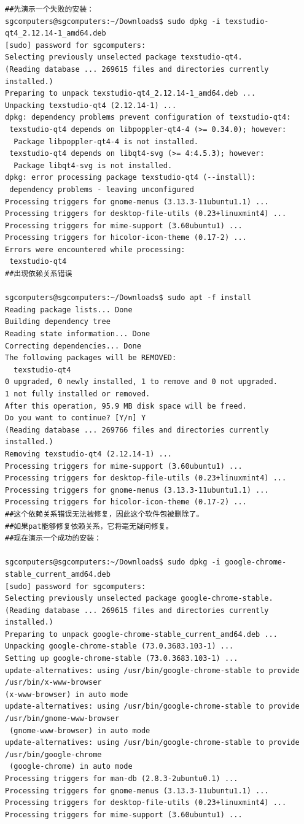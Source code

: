 \begin{verbatim}
##先演示一个失败的安装：
sgcomputers@sgcomputers:~/Downloads$ sudo dpkg -i texstudio-qt4_2.12.14-1_amd64.deb
[sudo] password for sgcomputers: 
Selecting previously unselected package texstudio-qt4.
(Reading database ... 269615 files and directories currently installed.)
Preparing to unpack texstudio-qt4_2.12.14-1_amd64.deb ...
Unpacking texstudio-qt4 (2.12.14-1) ...
dpkg: dependency problems prevent configuration of texstudio-qt4:
 texstudio-qt4 depends on libpoppler-qt4-4 (>= 0.34.0); however:
  Package libpoppler-qt4-4 is not installed.
 texstudio-qt4 depends on libqt4-svg (>= 4:4.5.3); however:
  Package libqt4-svg is not installed.
dpkg: error processing package texstudio-qt4 (--install):
 dependency problems - leaving unconfigured
Processing triggers for gnome-menus (3.13.3-11ubuntu1.1) ...
Processing triggers for desktop-file-utils (0.23+linuxmint4) ...
Processing triggers for mime-support (3.60ubuntu1) ...
Processing triggers for hicolor-icon-theme (0.17-2) ...
Errors were encountered while processing:
 texstudio-qt4
##出现依赖关系错误

sgcomputers@sgcomputers:~/Downloads$ sudo apt -f install
Reading package lists... Done
Building dependency tree       
Reading state information... Done
Correcting dependencies... Done
The following packages will be REMOVED:
  texstudio-qt4
0 upgraded, 0 newly installed, 1 to remove and 0 not upgraded.
1 not fully installed or removed.
After this operation, 95.9 MB disk space will be freed.
Do you want to continue? [Y/n] Y
(Reading database ... 269766 files and directories currently installed.)
Removing texstudio-qt4 (2.12.14-1) ...
Processing triggers for mime-support (3.60ubuntu1) ...
Processing triggers for desktop-file-utils (0.23+linuxmint4) ...
Processing triggers for gnome-menus (3.13.3-11ubuntu1.1) ...
Processing triggers for hicolor-icon-theme (0.17-2) ...
##这个依赖关系错误无法被修复，因此这个软件包被删除了。
##如果pat能够修复依赖关系，它将毫无疑问修复。
##现在演示一个成功的安装：

sgcomputers@sgcomputers:~/Downloads$ sudo dpkg -i google-chrome-stable_current_amd64.deb
[sudo] password for sgcomputers: 
Selecting previously unselected package google-chrome-stable.
(Reading database ... 269615 files and directories currently installed.)
Preparing to unpack google-chrome-stable_current_amd64.deb ...
Unpacking google-chrome-stable (73.0.3683.103-1) ...
Setting up google-chrome-stable (73.0.3683.103-1) ...
update-alternatives: using /usr/bin/google-chrome-stable to provide /usr/bin/x-www-browser 
(x-www-browser) in auto mode
update-alternatives: using /usr/bin/google-chrome-stable to provide /usr/bin/gnome-www-browser
 (gnome-www-browser) in auto mode
update-alternatives: using /usr/bin/google-chrome-stable to provide /usr/bin/google-chrome
 (google-chrome) in auto mode
Processing triggers for man-db (2.8.3-2ubuntu0.1) ...
Processing triggers for gnome-menus (3.13.3-11ubuntu1.1) ...
Processing triggers for desktop-file-utils (0.23+linuxmint4) ...
Processing triggers for mime-support (3.60ubuntu1) ...

\end{verbatim} \par
